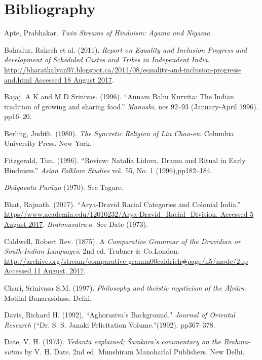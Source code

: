\section*{Bibliography}

\begin{thebibliography}{99}
 Apte, Prabhakar. \textit{Twin Streams of Hinduism: Agama and Nigama}.

  Bahadur, Rakesh et al. (2011). \textit{Report on Equality and Inclusion Progress and development of Scheduled Castes and Tribes in Independent India}. \url{http://bharatkalyan97.blogspot.ca/2011/08/equality-and-inclusion-progress-and.html Accessed 18 August 2017}.

  Bajaj, A K and M D Srinivas. (1996). “Annam Bahu Kurvita: The Indian tradition of growing and sharing food.” \textit{Manushi}, nos 92–93 (January-April 1996). pp16–20.

  Berling, Judith. (1980). \textit{The Syncretic Religion of Lin Chao-en}. Columbia University Press. New York.

  Fitzgerald, Tim. (1996). “Review: Natalia Lidova, Drama and Ritual in Early Hinduism.” \textit{Asian Folklore Studies} vol. 55, No. 1 (1996),\break pp182–184.

  \textit{Bhāgavata Purāṇa} (1970). See Tagare.

  Bhat, Rajnath. (2017). “Arya-Dravid Racial Categories and Colonial India.” \url{https//www.academia.edu/12010232/Arya-Dravid_Racial_Division. Accessed 5 August 2017}. \textit{Brahmasutra-}s. See Date (1973).

  Caldwell, Robert Rev. (1875). A \textit{Comparative Grammar of the Dravidian or South-Indian Languages}. 2nd ed. Trubner \& Co.London. \url{http://archive.org/stream/comparative gramm00caldrich#page/n5/mode/2up Accessed 11 August, 2017}.

  Chari, Srinivasa S.M. (1997). \textit{Philosophy and theistic mysticism of the Āļvārs}. Motilal Banarasidass. Delhi.

  Davis, Richard H. (1992), “Aghorasiva's Background." \textit{Journal of Oriental Research} (“Dr. S. S. Janaki Felicitation Volume."(1992). pp367–378.

  Date, V. H. (1973). \textit{Vedānta explained; Śamkara’s commentary on the Brahma-sūtras} by V. H. Date. 2nd ed. Munshiram Manoharlal Publishers. New Delhi.


\end{thebibliography}
